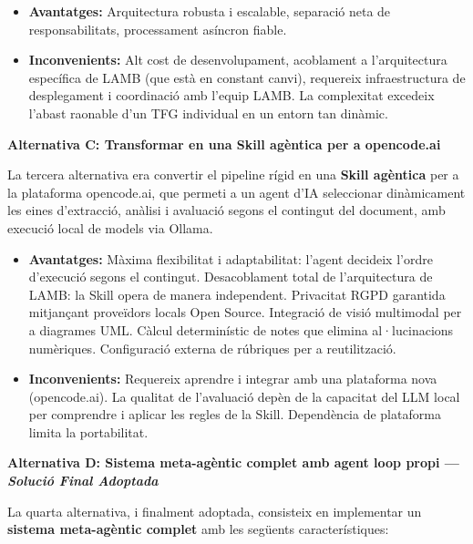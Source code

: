 \documentclass[12pt,a4paper,twoside]{report}
\begin{document}
\begin{itemize}
    \item \textbf{Avantatges:} Arquitectura robusta i escalable, separaci\'o neta de responsabilitats, processament as\'incron fiable.
    \item \textbf{Inconvenients:} Alt cost de desenvolupament, acoblament a l'arquitectura espec\'ifica de LAMB (que est\`a en constant canvi), requereix infraestructura de desplegament i coordinaci\'o amb l'equip LAMB. La complexitat excedeix l'abast raonable d'un TFG individual en un entorn tan din\`amic.
\end{itemize}

\textbf{Alternativa C: Transformar en una Skill ag\`entica per a opencode.ai}

La tercera alternativa era convertir el pipeline r\'igid en una \textbf{Skill ag\`entica} per a la plataforma opencode.ai, que permeti a un agent d'IA seleccionar din\`amicament les eines d'extracci\'o, an\`alisi i avaluaci\'o segons el contingut del document, amb execuci\'o local de models via Ollama.

\begin{itemize}
    \item \textbf{Avantatges:} M\`axima flexibilitat i adaptabilitat: l'agent decideix l'ordre d'execuci\'o segons el contingut. Desacoblament total de l'arquitectura de LAMB: la Skill opera de manera independent. Privacitat RGPD garantida mitjan\c{c}ant prove\"idors locals Open Source. Integraci\'o de visi\'o multimodal per a diagrames UML. C\`alcul determin\'istic de notes que elimina al·lucinacions num\`eriques. Configuraci\'o externa de r\'ubriques per a reutilitzaci\'o.
    \item \textbf{Inconvenients:} Requereix aprendre i integrar amb una plataforma nova (opencode.ai). La qualitat de l'avaluaci\'o dep\`en de la capacitat del LLM local per comprendre i aplicar les regles de la Skill. Depend\`encia de plataforma limita la portabilitat.
\end{itemize}

\textbf{Alternativa D: Sistema meta-ag\`entic complet amb agent loop propi --- \textit{Soluci\'o Final Adoptada}}

La quarta alternativa, i finalment adoptada, consisteix en implementar un \textbf{sistema meta-ag\`entic complet} amb les seg\"uents caracter\'istiques:
\end{document}
